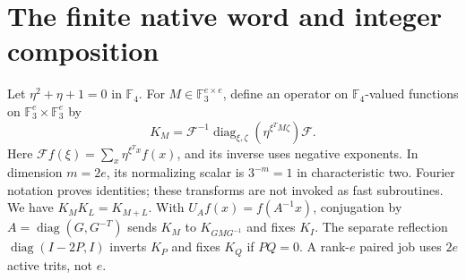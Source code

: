 \documentclass[11pt]{article}
\newcommand{\F}{\mathbb F}
\begin{document}
\section{The finite native word and integer composition}
Let $\eta^2+\eta+1=0$ in $\F_4$. For $M\in\F_3^{e\times e}$,
define an operator on $\F_4$-valued functions on
$\F_3^e\times\F_3^e$ by
\[K_M=\mathcal F^{-1}\operatorname{diag}_{\xi,\zeta}
 (\eta^{\xi^TM\zeta})\mathcal F.\]
Here $\mathcal Ff(\xi)=\sum_x\eta^{\xi^Tx}f(x)$, and its inverse
uses negative exponents. In dimension $m=2e$, its normalizing scalar is $3^{-m}=1$ in
characteristic two. Fourier notation proves identities; these transforms
are not invoked as fast subroutines. We have $K_MK_L=K_{M+L}$.
With $U_Af(x)=f(A^{-1}x)$, conjugation by
$A=\operatorname{diag}(G,G^{-T})$ sends $K_M$ to $K_{GMG^{-1}}$
and fixes $K_I$. The separate reflection
$\operatorname{diag}(I-2P,I)$ inverts $K_P$ and fixes $K_Q$ if $PQ=0$.
A rank-$e$ paired job uses $2e$ active trits, not $e$.
\end{document}
